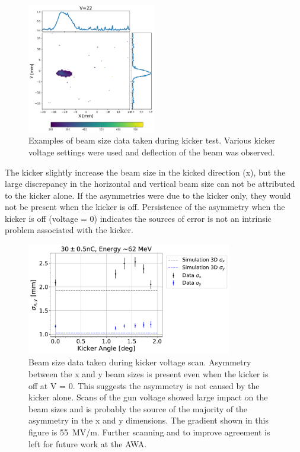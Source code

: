 \begin{figure}
	\includegraphics[width=0.5\textwidth]{./images/yag6_kicker_voltage22}%
	\caption{Examples of beam size data taken during kicker test. 
		Various kicker voltage settings were used and deflection of the beam was observed.}
	\label{fig:kickerbeamsize}
\end{figure}
The kicker slightly increase the beam size in the kicked direction (x), 
but the large discrepancy in the horizontal and vertical beam size can not be attributed to the kicker alone.
If the asymmetries were due to the kicker only, they would not be present when the kicker is off.
Persistence of the asymmetry when the kicker is off (voltage = 0) indicates 
the sources of error is not an intrinsic problem associated with the kicker.
\begin{figure}
	\centering
	\includegraphics[width=0.8\textwidth]{./images/xybeamsizes_high_charge_kicker_scan_angle_asymmetric}
	\caption{Beam size data taken during kicker voltage scan. Asymmetry between the x and y beam sizes
		 is present even when the kicker is off at V = 0. This suggests the asymmetry is not
	     caused by the kicker alone. Scans of the gun voltage showed large impact on the beam sizes
     	 and is probably the source of the majority of the asymmetry in the x and y dimensions.
         The gradient shown in this figure is \SI{55}{MV/m}. Further scanning and to improve agreement
     	is left for future work at the AWA. }
     \label{fig:beamsize}
\end{figure}

